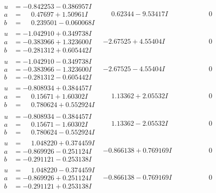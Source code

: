 \documentclass[1p]{elsarticle_modified}
\theoremstyle{definition}
\begin{document}
$$\begin{array}{c|c|c}
\begin{aligned}
u &= -0.842253 - 0.386957 I \\
a &= \phantom{-}0.47697 + 1.50961 I \\
b &= \phantom{-}0.239501 - 0.060068 I\end{aligned}
 & \phantom{-}0.62344 - 9.53417 I & \phantom{-0.000000 } 0 \\ \hline\begin{aligned}
u &= -1.042910 + 0.349738 I \\
a &= -0.383966 + 1.323600 I \\
b &= -0.281312 + 0.605442 I\end{aligned}
 & -2.67525 + 4.55404 I & \phantom{-0.000000 } 0 \\ \hline\begin{aligned}
u &= -1.042910 - 0.349738 I \\
a &= -0.383966 - 1.323600 I \\
b &= -0.281312 - 0.605442 I\end{aligned}
 & -2.67525 - 4.55404 I & \phantom{-0.000000 } 0 \\ \hline\begin{aligned}
u &= -0.808934 + 0.384457 I \\
a &= \phantom{-}0.15671 + 1.60302 I \\
b &= \phantom{-}0.780624 + 0.552924 I\end{aligned}
 & \phantom{-}1.13362 + 2.05532 I & \phantom{-0.000000 } 0 \\ \hline\begin{aligned}
u &= -0.808934 - 0.384457 I \\
a &= \phantom{-}0.15671 - 1.60302 I \\
b &= \phantom{-}0.780624 - 0.552924 I\end{aligned}
 & \phantom{-}1.13362 - 2.05532 I & \phantom{-0.000000 } 0 \\ \hline\begin{aligned}
u &= \phantom{-}1.048220 + 0.374459 I \\
a &= -0.869926 - 0.251124 I \\
b &= -0.291121 - 0.253138 I\end{aligned}
 & -0.866138 + 0.769169 I & \phantom{-0.000000 } 0 \\ \hline\begin{aligned}
u &= \phantom{-}1.048220 - 0.374459 I \\
a &= -0.869926 + 0.251124 I \\
b &= -0.291121 + 0.253138 I\end{aligned}
 & -0.866138 - 0.769169 I & \phantom{-0.000000 } 0 \\ \hline\begin{aligned}

\end{aligned}
\end{array}$$
\end{document}
